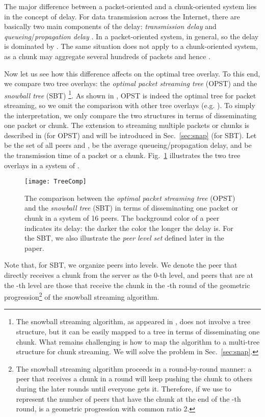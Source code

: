 \documentclass[conference]{IEEEtran}
\begin{document}
  The major difference between a packet-oriented and a chunk-oriented system lies in the concept of delay. For data transmission across the Internet, there are basically two main components of the delay: \textit{transmission delay}  and \textit{queueing}/\textit{propagation delay} . In a packet-oriented system,  in general, so the delay is dominated by . The same situation does not apply to a chunk-oriented system, as a chunk may aggregate several hundreds of packets and hence .

  Now let us see how this difference affects on the optimal tree overlay. To this end, we compare two tree overlays: the \textit{optimal packet streaming tree} (OPST) \cite{LiuSJRC-SIGMETRICS08} and the \textit{snowball tree} (SBT) \cite{Liu-MM07}\footnote{The snowball streaming algorithm, as appeared in \cite{Liu-MM07}, does not involve a tree structure, but it can be easily mapped to a tree in terms of disseminating one chunk. What remains challenging is how to map the algorithm to a multi-tree structure for chunk streaming. We will solve the problem in Sec.~\ref{sec:snap}.}. As shown in \cite{LiuSJRC-SIGMETRICS08}, OPST is indeed the optimal tree for packet streaming, so we omit the comparison with other tree overlays (e.g. \cite{CastroDKNRS-SOSP03}). To simply the interpretation, we only compare the two structures in terms of disseminating one packet or chunk. The extension to streaming multiple packets or chunks is described in \cite{LiuSJRC-SIGMETRICS08} (for OPST) and will be introduced in Sec.~\ref{sec:snap} (for SBT). Let \framebox{} be the set of all peers and ,  be the average queueing/propagation delay, and  be the transmission time of a packet or a chunk. Fig.~\ref{fig:treecomp} illustrates the two tree overlays in a system of .
\begin{figure}[!h]
   \begin{center}
        \texttt{[image: TreeComp]}
\caption{The comparison between the \textit{optimal packet streaming tree} (OPST) \cite{LiuSJRC-SIGMETRICS08} and the \textit{snowball tree} (SBT) \cite{Liu-MM07} in terms of disseminating one packet or chunk in a system of 16 peers. The background color of a peer indicates its delay: the darker the color the longer the delay is. For the SBT, we also illustrate the \textit{peer level set} defined later in the paper.}\label{fig:treecomp}
   \end{center}
\end{figure}
Note that, for SBT, we organize peers into levels. We denote the peer that directly receives a chunk from the server as the 0-th level, and peers that are at the -th level are those that receive the chunk in the -th round of the geometric progression\footnote{The snowball streaming algorithm \cite{Liu-MM07} proceeds in a round-by-round manner: a peer that receives a chunk in a round will keep pushing the chunk to others during the later rounds until everyone gets it. Therefore, if we use  to represent the number of peers that have the chunk at the end of the -th round,  is a geometric progression with common ratio 2.} of the snowball streaming algorithm.
\end{document}
